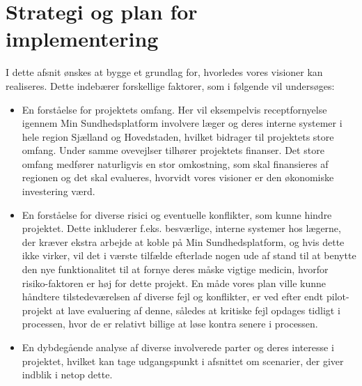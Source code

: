 \section{Strategi og plan for implementering}
I dette afsnit ønskes at bygge et grundlag for, hvorledes vores visioner kan realiseres.
Dette indebærer forskellige faktorer, som i følgende vil undersøges:
\begin{itemize}
  \item En forståelse for projektets omfang. Her vil eksempelvis receptfornyelse igennem Min Sundhedsplatform involvere læger og deres interne systemer i hele region Sjælland og Hovedstaden, hvilket bidrager til projektets store omfang. Under samme ovevejlser tilhører projektets finanser. Det store omfang medfører naturligvis en stor omkostning, som skal finansieres af regionen og det skal evalueres, hvorvidt vores visioner er den økonomiske investering værd. 
  \item En forståelse for diverse risici og eventuelle konflikter, som kunne hindre projektet. Dette inkluderer f.eks. besværlige, interne systemer hos lægerne, der kræver ekstra arbejde at koble på Min Sundhedsplatform, og hvis dette ikke virker, vil det i værste tilfælde efterlade nogen ude af stand til at benytte den nye funktionalitet til at fornye deres måske vigtige medicin, hvorfor risiko-faktoren er høj for dette projekt. 
  En måde vores plan ville kunne håndtere tilstedeværelsen af diverse fejl og konflikter, er ved efter endt pilot-projekt at lave evaluering af denne, således at kritiske fejl opdages tidligt i processen, hvor de er relativt billige at løse kontra senere i processen.  
  \item En dybdegående analyse af diverse involverede parter og deres interesse i projektet, hvilket kan tage udgangspunkt i afsnittet om scenarier, der giver indblik i netop dette. 
\end{itemize}


